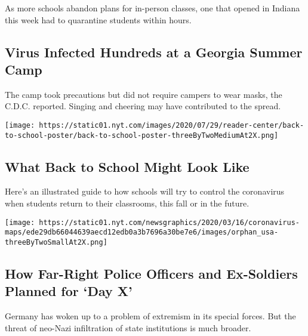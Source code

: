 As more schools abandon plans for in-person classes, one that opened in
Indiana this week had to quarantine students within hours.

\href{/2020/07/31/health/coronavirus-children-camp.html}{}

\hypertarget{virus-infected-hundreds-at-a-georgia-summer-camp}{%
\subsection{Virus Infected Hundreds at a Georgia Summer
Camp}\label{virus-infected-hundreds-at-a-georgia-summer-camp}}

The camp took precautions but did not require campers to wear masks, the
C.D.C. reported. Singing and cheering may have contributed to the
spread.

\href{/interactive/2020/07/29/us/schools-reopening-coronavirus.html}{}

\texttt{[image: https://static01.nyt.com/images/2020/07/29/reader-center/back-to-school-poster/back-to-school-poster-threeByTwoMediumAt2X.png]}

\href{/interactive/2020/07/29/us/schools-reopening-coronavirus.html}{}

\hypertarget{what-back-to-school-might-look-like}{%
\subsection{What Back to School Might Look
Like}\label{what-back-to-school-might-look-like}}

Here's an illustrated guide to how schools will try to control the
coronavirus when students return to their classrooms, this fall or in
the future.

\texttt{[image: https://static01.nyt.com/newsgraphics/2020/03/16/coronavirus-maps/ede29db66044639aecd12edb0a3b7696a30be7e6/images/orphan\_usa-threeByTwoSmallAt2X.png]}

\href{/2020/08/01/world/europe/germany-nazi-infiltration.html}{}

\hypertarget{how-far-right-police-officers-and-ex-soldiers-planned-for-day-x}{%
\subsection{How Far-Right Police Officers and Ex-Soldiers Planned for
`Day
X'}\label{how-far-right-police-officers-and-ex-soldiers-planned-for-day-x}}

Germany has woken up to a problem of extremism in its special forces.
But the threat of neo-Nazi infiltration of state institutions is much
broader.

